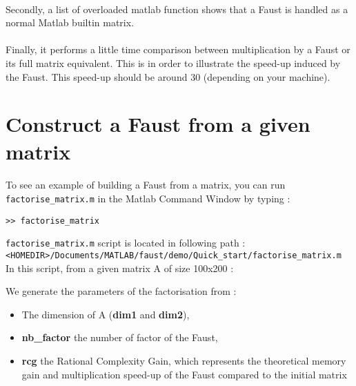 \paragraph{}Secondly, a list of overloaded matlab function shows that a Faust is handled as a normal Matlab builtin matrix.
 


\paragraph{}Finally, it performs a little time comparison between multiplication by a Faust or its full matrix equivalent.
This is in order to illustrate the speed-up induced by the Faust. This speed-up should be around 30 (depending on your machine).
%

\newpage
\section{Construct a Faust from a given matrix}\label{sec:firstUseBuildFromMatrix}
\paragraph{} To see an example of building a Faust from a matrix, you can run \texttt{factorise\_matrix.m} in the Matlab Command Window by typing :
\lstset{style=customMatlab}
\begin{lstlisting}
>> factorise_matrix
\end{lstlisting}
\texttt{factorise\_matrix.m} script is located in following path :\\
\texttt{<HOMEDIR>/Documents/MATLAB/faust/demo/Quick\_start/factorise\_matrix.m} \\

In this script, from a given matrix A of size 100x200 :

We generate the parameters of the factorisation from :
\begin{itemize}
\item The dimension of A (\textbf{dim1} and \textbf{dim2}),
\item \textbf{nb\_factor} the number of factor of the Faust,
\item \textbf{rcg} the Rational Complexity Gain, which represents the theoretical memory gain and multiplication speed-up of the Faust compared to the initial matrix 
\end{itemize}

